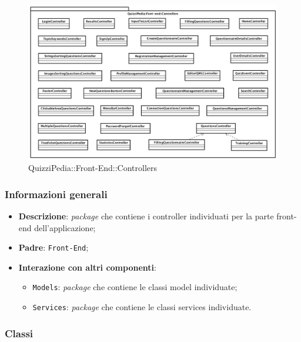 \begin{figure} [ht]
	\centering
	\includegraphics[scale=0.42]{UML/Package/QuizziPedia_Front-End_Controllers.png}
	\caption{QuizziPedia::Front-End::Controllers}
\end{figure} \FloatBarrier

\subsubsection{Informazioni generali}
\begin{itemize}
	\item \textbf{Descrizione}: \textit{package} che contiene i controller individuati per la parte front-end dell'applicazione;
	\item \textbf{Padre}: \texttt{Front-End};
	\item \textbf{Interazione con altri componenti}:
	\begin{itemize}
		\item \texttt{Models}: \textit{package} che contiene le classi model individuate;
		\item \texttt{Services}: \textit{package} che contiene le classi services individuate.
	\end{itemize} 
\end{itemize}
\subsubsection{Classi}


